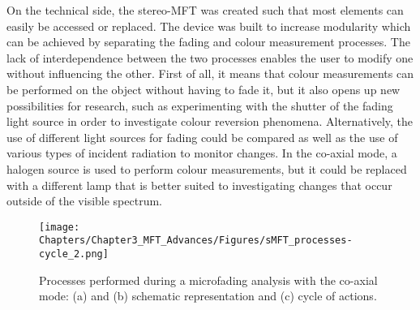 On the technical side, the stereo-MFT was created such that most elements can easily be accessed or replaced. The device was built to increase modularity which can be achieved by separating the fading and colour measurement processes. The lack of interdependence between the two processes enables the user to modify one without influencing the other. First of all, it means that colour measurements can be performed on the object without having to fade it, but it also opens up new possibilities for research, such as experimenting with the shutter of the fading light source in order to investigate colour reversion phenomena. Alternatively, the use of different light sources for fading could be compared as well as the use of various types of incident radiation to monitor changes. In the co-axial mode, a halogen source is used to perform colour measurements, but it could be replaced with a different lamp that is better suited to investigating changes that occur outside of the visible spectrum.\\

\begin{figure*}[!h]
\centering
\texttt{[image: Chapters/Chapter3\_MFT\_Advances/Figures/sMFT\_processes-cycle\_2.png]}
\caption[\hspace{0.3cm}Processes performed during a microfading analysis]{Processes performed during a microfading analysis with the co-axial mode: (a) and (b) schematic representation and (c) cycle of actions.}
\label{fig:sMFT_processes}
\end{figure*}


